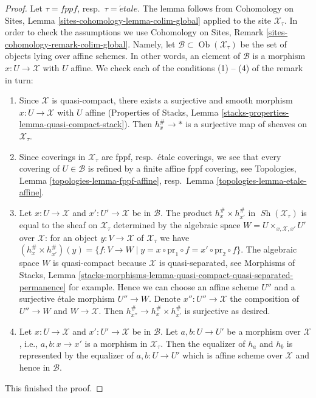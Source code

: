 \documentclass{stacks-project}
\theoremstyle{plain}
\theoremstyle{definition}
\theoremstyle{remark}
\numberwithin{equation}{subsection}
\def\Ob{\mathop{\mathrm{Ob}}\nolimits}
\def\Sh{\mathop{\mathit{Sh}}\nolimits}
\def\etale{{\acute{e}tale}}
\begin{document}
\begin{proof}
Let $\tau = fppf$, resp.\ $\tau = \etale$. The lemma follows from
Cohomology on Sites, Lemma \ref{sites-cohomology-lemma-colim-global}
applied to the site $\mathcal{X}_\tau$. In order to check the assumptions we
use Cohomology on Sites, Remark \ref{sites-cohomology-remark-colim-global}.
Namely, let $\mathcal{B} \subset \Ob(\mathcal{X}_\tau)$ be the set
of objects lying over affine schemes. In other words, an element
of $\mathcal{B}$ is a morphism $x : U \to \mathcal{X}$ with $U$ affine.
We check each of the conditions (1) -- (4) of the remark in turn:
\begin{enumerate}
\item Since $\mathcal{X}$ is quasi-compact, there exists a
surjective and smooth morphism $x : U \to \mathcal{X}$ with $U$ affine
(Properties of Stacks, Lemma
\ref{stacks-properties-lemma-quasi-compact-stack}).
Then $h_x^\# \to *$ is a surjective map of sheaves on $\mathcal{X}_\tau$.
\item Since coverings in $\mathcal{X}_\tau$ are fppf, resp.\ \'etale
coverings, we see that every covering of $U \in \mathcal{B}$ is refined
by a finite affine fppf covering, see
Topologies, Lemma \ref{topologies-lemma-fppf-affine},
resp.\ Lemma \ref{topologies-lemma-etale-affine}.
\item Let $x : U \to \mathcal{X}$ and $x' : U' \to \mathcal{X}$ be
in $\mathcal{B}$. The product $h_x^\# \times h_{x'}^\#$ in
$\Sh(\mathcal{X}_\tau)$ is equal to the sheaf on $\mathcal{X}_\tau$
determined by the algebraic space $W = U \times_{x, \mathcal{X}, x'} U'$ over
$\mathcal{X}$: for an object $y : V \to \mathcal{X}$ of
$\mathcal{X}_\tau$ we have
$(h_x^\# \times h_{x'}^\#)(y) = \{f : V \to W \mid y =
x \circ \text{pr}_1 \circ f = x' \circ \text{pr}_2 \circ f\}$.
The algebraic space $W$ is quasi-compact because $\mathcal{X}$
is quasi-separated, see Morphisms of Stacks, Lemma
\ref{stacks-morphisms-lemma-quasi-compact-quasi-separated-permanence}
for example. Hence we can choose an affine scheme $U''$ and
a surjective \'etale morphism $U'' \to W$. Denote $x'' : U'' \to \mathcal{X}$
the composition of $U'' \to W$ and $W \to \mathcal{X}$. Then
$h_{x''}^\# \to h_x^\# \times h_{x'}^\#$ is surjective as desired.
\item Let $x : U \to \mathcal{X}$ and $x' : U' \to \mathcal{X}$ be
in $\mathcal{B}$. Let $a, b : U \to U'$ be a morphism over $\mathcal{X}$,
i.e., $a, b  : x \to x'$ is a morphism in $\mathcal{X}_\tau$.
Then the equalizer of $h_a$ and $h_b$ is represented by the
equalizer of $a, b : U \to U'$ which is
affine scheme over $\mathcal{X}$ and hence in $\mathcal{B}$.
\end{enumerate}
This finished the proof.
\end{proof}
\end{document}
